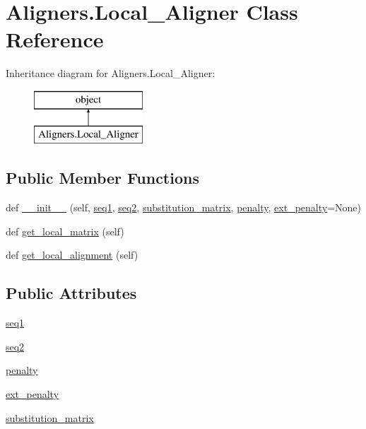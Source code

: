 \hypertarget{class_aligners_1_1_local___aligner}{}\section{Aligners.\+Local\+\_\+\+Aligner Class Reference}
\label{class_aligners_1_1_local___aligner}
Inheritance diagram for Aligners.\+Local\+\_\+\+Aligner\+:\begin{figure}[H]
\begin{center}
\leavevmode
\includegraphics[height=2.000000cm]{class_aligners_1_1_local___aligner}
\end{center}
\end{figure}
\subsection*{Public Member Functions}
\begin{DoxyCompactItemize}
\item 
def \hyperlink{class_aligners_1_1_local___aligner_abbe736e7f3e06b702a844384a1fe85b6}{\+\_\+\+\_\+init\+\_\+\+\_\+} (self, \hyperlink{class_aligners_1_1_local___aligner_a285806896f5d284119dfa1f63792c45e}{seq1}, \hyperlink{class_aligners_1_1_local___aligner_af0ce861edb14e519aa5cda0dbd50600c}{seq2}, \hyperlink{class_aligners_1_1_local___aligner_a6ea6deadde6b8207bfb2c001c4bb3f42}{substitution\+\_\+matrix}, \hyperlink{class_aligners_1_1_local___aligner_aa41272a04dd3ec9ca9e9dcecc6fd2566}{penalty}, \hyperlink{class_aligners_1_1_local___aligner_aa7d238d0b57edc861e02b0b39c8fb7f1}{ext\+\_\+penalty}=None)
\item 
def \hyperlink{class_aligners_1_1_local___aligner_a2df499a9d5f9b3cbae94999687bc7a5d}{get\+\_\+local\+\_\+matrix} (self)
\item 
def \hyperlink{class_aligners_1_1_local___aligner_ad7c960fc046613632da34db5857e4c19}{get\+\_\+local\+\_\+alignment} (self)
\end{DoxyCompactItemize}
\subsection*{Public Attributes}
\begin{DoxyCompactItemize}
\item 
\hyperlink{class_aligners_1_1_local___aligner_a285806896f5d284119dfa1f63792c45e}{seq1}
\item 
\hyperlink{class_aligners_1_1_local___aligner_af0ce861edb14e519aa5cda0dbd50600c}{seq2}
\item 
\hyperlink{class_aligners_1_1_local___aligner_aa41272a04dd3ec9ca9e9dcecc6fd2566}{penalty}
\item 
\hyperlink{class_aligners_1_1_local___aligner_aa7d238d0b57edc861e02b0b39c8fb7f1}{ext\+\_\+penalty}
\item 
\hyperlink{class_aligners_1_1_local___aligner_a6ea6deadde6b8207bfb2c001c4bb3f42}{substitution\+\_\+matrix}
\end{DoxyCompactItemize}


